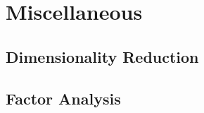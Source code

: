 \chapter{Miscellaneous}
\label{chap:misc}

\section{Dimensionality Reduction}
\label{misc:m_reduction}

\section{Factor Analysis}
\label{misc:factor_ana}

